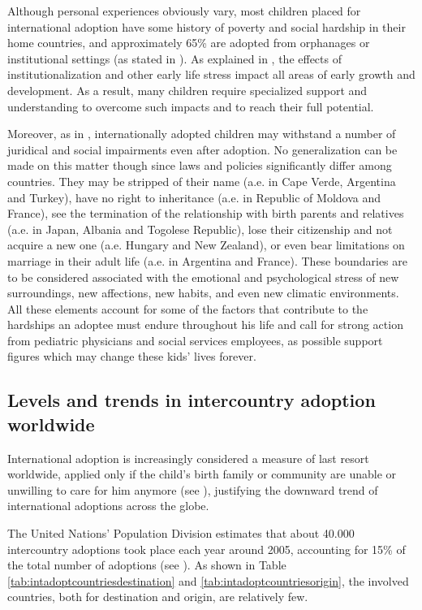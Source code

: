 Although personal experiences obviously vary, most children placed for international adoption have some history of poverty and social hardship in their home countries, and approximately 65\% are adopted from orphanages or institutional settings (as stated in \cite{caringfor}). As explained in \cite{nelson}, the effects of institutionalization and other early life stress impact all areas of early growth and development. As a result, many children require specialized support and understanding to overcome such impacts and to reach their full potential. 

Moreover, as in \cite{unreport}, internationally adopted children may withstand a number of juridical and social impairments even after adoption. No generalization can be made on this matter though since laws and policies significantly differ among countries. They may be stripped of their name (a.e. in Cape Verde, Argentina and Turkey), have no right to inheritance (a.e. in Republic of Moldova and France), see the termination of the relationship with birth parents and relatives (a.e. in Japan, Albania and Togolese Republic), lose their citizenship and not acquire a new one (a.e. Hungary and New Zealand), or even bear limitations on marriage in their adult life (a.e. in Argentina and France). These boundaries are to be considered associated with the emotional and psychological stress of new surroundings, new affections, new habits, and even new climatic environments.\\
All these elements account for some of the factors that contribute to the hardships an adoptee must endure throughout his life and call for strong action from pediatric physicians and social services employees, as possible support figures which may change these kids' lives forever.

\subsection{Levels and trends in intercountry adoption worldwide}\label{sub:levelsintercountry}
International adoption is increasingly considered a measure of last resort worldwide, applied only if the child's birth family or community are unable or unwilling to care for him anymore (see \cite{nelson}), justifying the downward trend of international adoptions across the globe. 

The United Nations' Population Division estimates that about 40.000 intercountry adoptions took place each year around 2005, accounting for 15\% of the total number of adoptions (see \cite{unreport}). As shown in Table \ref{tab:intadoptcountriesdestination} and \ref{tab:intadoptcountriesorigin}, the involved countries, both for destination and origin, are relatively few.

